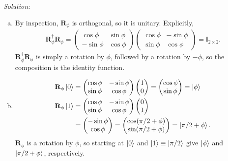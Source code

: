 \documentclass{book}
\theoremstyle{definition}
\newcommand{\nn}{\nonumber}
\newcommand{\Id}{\mathbb{I}}
\begin{document}
\noindent \textit{Solution:} 
\begin{enumerate}[(a)]
	\item By inspection, $\mathbf{R}_\phi$ is orthogonal, so it is unitary. Explicitly,
	\begin{align}
	\mathbf{R}_\phi^\dagger \mathbf{R}_\phi = 
	\begin{pmatrix}
	\cos\phi & \sin\phi \\ -\sin\phi & \cos\phi
	\end{pmatrix}
	\begin{pmatrix}
	\cos\phi & -\sin\phi \\ \sin\phi & \cos\phi
	\end{pmatrix} = \Id_{2\times 2}.
	\end{align}
	$\mathbf{R}_\phi^\dagger \mathbf{R}_\phi$ is simply a rotation by $\phi$, followed by a rotation by $-\phi$, so the composition is the identity function.
	
	\item 
	\begin{align}
	\mathbf{R}_\phi\ket{0} &= \begin{pmatrix}
	\cos\phi & -\sin\phi \\ \sin\phi & \cos\phi
	\end{pmatrix}\begin{pmatrix}
	1\\0
	\end{pmatrix} = \begin{pmatrix}
	\cos\phi \\ \sin\phi
	\end{pmatrix} = \ket{\phi}\\
	\mathbf{R}_\phi\ket{1} &= \begin{pmatrix}
	\cos\phi & -\sin\phi \\ \sin\phi & \cos\phi
	\end{pmatrix}\begin{pmatrix}
	0\\1
	\end{pmatrix} \nn\\
	&= \begin{pmatrix}
	-\sin\phi \\ \cos\phi
	\end{pmatrix} = \begin{pmatrix}
	\cos(\pi/2+\phi) \\ \sin(\pi/2+\phi)
	\end{pmatrix} = \ket{\pi/2 + \phi}.
	\end{align}
	$\mathbf{R}_\phi$ is a rotation by $\phi$, so starting at $\ket{0}$ and $\ket{1}\equiv \ket{\pi/2}$ give $\ket{\phi}$ and $\ket{\pi/2+\phi}$, respectively.
	

\end{enumerate}
\end{document}
